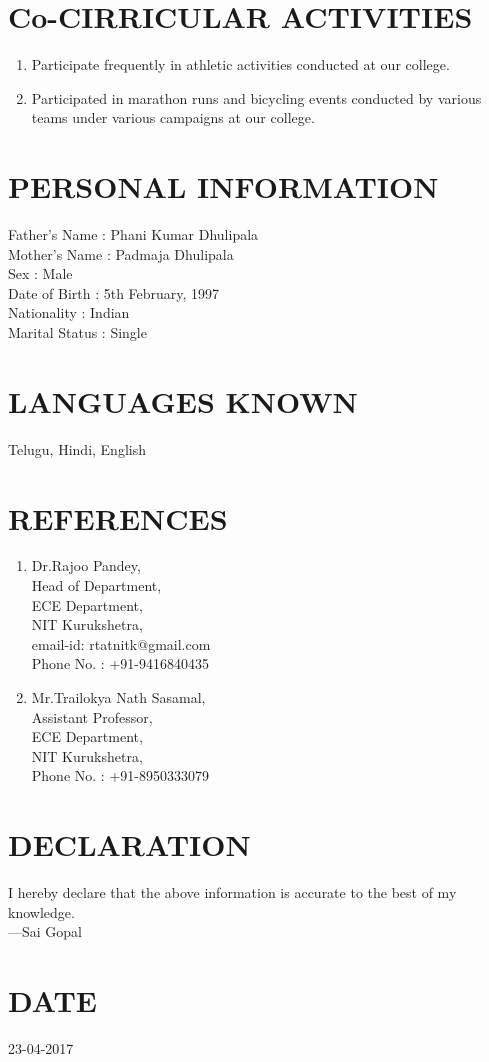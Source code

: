 \documentclass[a4paper]{article}
\begin{document}
\begin{Large}
\section*{\textbf{Co-CIRRICULAR ACTIVITIES}}
\begin{enumerate}
\item Participate frequently in athletic activities conducted at our college.
\item Participated in marathon runs and bicycling events  conducted by various teams under various campaigns at our college.
\end{enumerate}

\section*{\textbf{PERSONAL INFORMATION}}
Father's Name  : Phani Kumar Dhulipala\\
Mother's Name  : Padmaja Dhulipala\\
Sex            : Male\\
Date of Birth  : 5th February, 1997\\
Nationality    : Indian\\
Marital Status : Single

\section*{\textbf{LANGUAGES KNOWN}}
Telugu, Hindi, English

\section*{\textbf{REFERENCES}}
\begin{enumerate}
\item Dr.Rajoo Pandey,\\
Head of Department,\\
ECE Department,\\
NIT Kurukshetra,\\
email-id: rtatnitk@gmail.com\\
Phone No. : +91-9416840435
\item Mr.Trailokya Nath Sasamal,\\
Assistant Professor,\\
ECE Department,\\
NIT Kurukshetra,\\
Phone No. : +91-8950333079
\end{enumerate}

\section*{\textbf{DECLARATION}}
I hereby declare that the above information is accurate to the best of my knowledge.\\
---Sai Gopal

\section*{\textbf{DATE}}
23-04-2017
   \end{Large}
\end{document}
